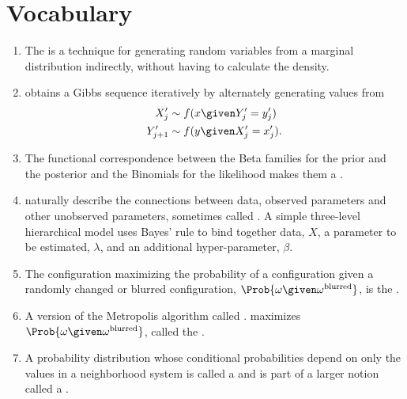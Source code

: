 \documentclass[12pt]{article}
\begin{document}
\section*{Vocabulary}
\begin{enumerate}
    \item
        The  is a technique for generating random
        variables from a marginal distribution%
        indirectly, without having to calculate the density.
    \item
         obtains a Gibbs sequence iteratively by
        alternately generating values from
        \begin{align*}
            X'_j &\sim f(x \given Y'_j = y'_j) \\
            Y'_{j+1} &\sim f(y \given X'_j = x'_j).
        \end{align*}
    \item
        The functional correspondence between the Beta families for the
        prior and the posterior and the Binomials for the likelihood
        makes them a .%
    \item
         naturally describe the
        connections between data, observed parameters and other
        unobserved parameters, sometimes called .
        A simple three-level hierarchical model uses Bayes' rule to bind
        together data, \( X \), a parameter to be estimated, \( \lambda \),
        and an additional hyper-parameter, \( \beta \).
    \item
        The configuration maximizing the probability of a configuration
        given a randomly changed or blurred configuration, \( \Prob{\omega
        \given \omega^{\text{blurred}}} \), is the .
    \item
        A version of the Metropolis algorithm called . maximizes \( \Prob{\omega \given \omega^{\text{blurred}}}
        \), called the .
    \item
        A probability distribution whose conditional probabilities
        depend on only the values in a neighborhood system is called a
         and is part of a larger notion called
        a .
\end{enumerate}
\end{document}

